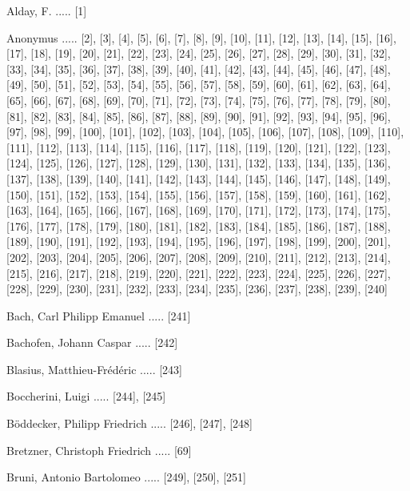 \documentclass[twocolumn, 12pt]{book}
\begin{document}
\newline 
Alday, F. ..... [1]

\newline 
Anonymus ..... [2], [3], [4], [5], [6], [7], [8], [9], [10], [11], [12], [13], [14], [15], [16], [17], [18], [19], [20], [21], [22], [23], [24], [25], [26], [27], [28], [29], [30], [31], [32], [33], [34], [35], [36], [37], [38], [39], [40], [41], [42], [43], [44], [45], [46], [47], [48], [49], [50], [51], [52], [53], [54], [55], [56], [57], [58], [59], [60], [61], [62], [63], [64], [65], [66], [67], [68], [69], [70], [71], [72], [73], [74], [75], [76], [77], [78], [79], [80], [81], [82], [83], [84], [85], [86], [87], [88], [89], [90], [91], [92], [93], [94], [95], [96], [97], [98], [99], [100], [101], [102], [103], [104], [105], [106], [107], [108], [109], [110], [111], [112], [113], [114], [115], [116], [117], [118], [119], [120], [121], [122], [123], [124], [125], [126], [127], [128], [129], [130], [131], [132], [133], [134], [135], [136], [137], [138], [139], [140], [141], [142], [143], [144], [145], [146], [147], [148], [149], [150], [151], [152], [153], [154], [155], [156], [157], [158], [159], [160], [161], [162], [163], [164], [165], [166], [167], [168], [169], [170], [171], [172], [173], [174], [175], [176], [177], [178], [179], [180], [181], [182], [183], [184], [185], [186], [187], [188], [189], [190], [191], [192], [193], [194], [195], [196], [197], [198], [199], [200], [201], [202], [203], [204], [205], [206], [207], [208], [209], [210], [211], [212], [213], [214], [215], [216], [217], [218], [219], [220], [221], [222], [223], [224], [225], [226], [227], [228], [229], [230], [231], [232], [233], [234], [235], [236], [237], [238], [239], [240]

\newline 
Bach, Carl Philipp Emanuel ..... [241]

\newline 
Bachofen, Johann Caspar ..... [242]

\newline 
Blasius, Matthieu-Frédéric ..... [243]

\newline 
Boccherini, Luigi ..... [244], [245]

\newline 
Böddecker, Philipp Friedrich ..... [246], [247], [248]

\newline 
Bretzner, Christoph Friedrich ..... [69]

\newline 
Bruni, Antonio Bartolomeo ..... [249], [250], [251]
\end{document}
